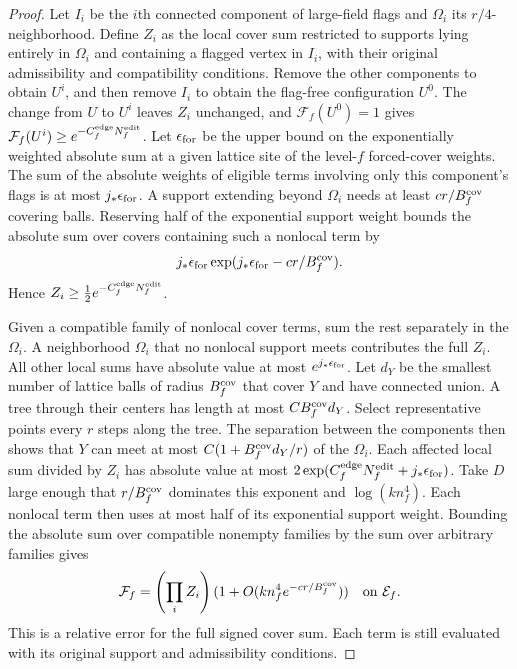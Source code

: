 \documentclass[11pt,a4paper]{article}
\numberwithin{equation}{section}
\begin{document}
\begin{proof}
Let \(I_i\) be the \(i\)th connected component of large-field flags and \(\Omega_i\) its \(r/4\)-neighborhood. Define \(Z_i\) as the local cover sum restricted to supports lying entirely in \(\Omega_i\) and containing a flagged vertex in \(I_i\), with their original admissibility and compatibility conditions. Remove the other components to obtain \(U^i\), and then remove \(I_i\) to obtain the flag-free configuration \(U^0\). The change from \(U\) to \(U^i\) leaves \(Z_i\) unchanged, and \(\mathcal F_f(U^0)=1\) gives \(\mathcal F_f(U^i)\ge e^{-C_f^{\rm edge}N_f^{\rm edit}}\). Let \(\epsilon_{\rm for}\) be the upper bound on the exponentially weighted absolute sum at a given lattice site of the level-\(f\) forced-cover weights. The sum of the absolute weights of eligible terms involving only this component's flags is at most \(j_*\epsilon_{\rm for}\). A support extending beyond \(\Omega_i\) needs at least \(cr/B_f^{\rm cov}\) covering balls. Reserving half of the exponential support weight bounds the absolute sum over covers containing such a nonlocal term by
\[
 j_*\epsilon_{\rm for}
       \exp(j_*\epsilon_{\rm for}-c r/B_f^{\rm cov}).
\]
Hence \(Z_i\ge \frac12e^{-C_f^{\rm edge}N_f^{\rm edit}}\).

Given a compatible family of nonlocal cover terms, sum the rest separately in the \(\Omega_i\). A neighborhood \(\Omega_i\) that no nonlocal support meets contributes the full \(Z_i\). All other local sums have absolute value at most \(e^{j_*\epsilon_{\rm for}}\). Let \(d_Y\) be the smallest number of lattice balls of radius \(B_f^{\rm cov}\) that cover \(Y\) and have connected union. A tree through their centers has length at most \(CB_f^{\rm cov}d_Y\). Select representative points every \(r\) steps along the tree. The separation between the components then shows that \(Y\) can meet at most \(C(1+B_f^{\rm cov}d_Y/r)\) of the \(\Omega_i\). Each affected local sum divided by \(Z_i\) has absolute value at most \(2\exp(C_f^{\rm edge}N_f^{\rm edit}+j_*\epsilon_{\rm for})\). Take \(D\) large enough that \(r/B_f^{\rm cov}\) dominates this exponent and \(\log(kn_f^4)\). Each nonlocal term then uses at most half of its exponential support weight. Bounding the absolute sum over compatible nonempty families by the sum over arbitrary families gives
\[
 \mathcal F_f=\left(\prod_i Z_i\right)
             (1+O(kn_f^4e^{-cr/B_f^{\rm cov}}))
 \quad\text{on }\mathcal E_f .
\]
This is a relative error for the full signed cover sum. Each term is still evaluated with its original support and admissibility conditions.


\end{proof}
\end{document}
